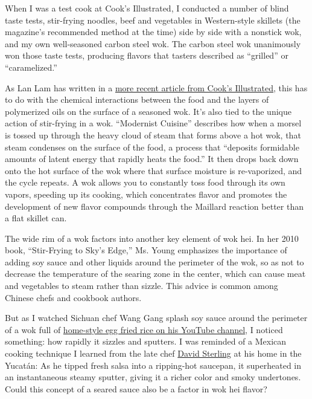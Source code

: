 When I was a test cook at Cook's Illustrated, I conducted a number of
blind taste tests, stir-frying noodles, beef and vegetables in
Western-style skillets (the magazine's recommended method at the time)
side by side with a nonstick wok, and my own well-seasoned carbon steel
wok. The carbon steel wok unanimously won those taste tests, producing
flavors that tasters described as ``grilled'' or ``caramelized.''

As Lan Lam has written in a
\href{https://www.cooksillustrated.com/articles/2189-the-science-of-stir-frying-in-a-wok}{more
recent article from Cook's Illustrated}, this has to do with the
chemical interactions between the food and the layers of polymerized
oils on the surface of a seasoned wok. It's also tied to the unique
action of stir-frying in a wok. ``Modernist Cuisine'' describes how when
a morsel is tossed up through the heavy cloud of steam that forms above
a hot wok, that steam condenses on the surface of the food, a process
that ``deposits formidable amounts of latent energy that rapidly heats
the food.'' It then drops back down onto the hot surface of the wok
where that surface moisture is re-vaporized, and the cycle repeats. A
wok allows you to constantly toss food through its own vapors, speeding
up its cooking, which concentrates flavor and promotes the development
of new flavor compounds through the Maillard reaction better than a flat
skillet can.

The wide rim of a wok factors into another key element of wok hei. In
her 2010 book, ``Stir-Frying to Sky's Edge,'' Ms. Young emphasizes the
importance of adding soy sauce and other liquids around the perimeter of
the wok, so as not to decrease the temperature of the searing zone in
the center, which can cause meat and vegetables to steam rather than
sizzle. This advice is common among Chinese chefs and cookbook authors.

But as I watched Sichuan chef Wang Gang splash soy sauce around the
perimeter of a wok full of
\href{https://www.youtube.com/watch?v=EvE5cYNXufY}{home-style egg fried
rice on his YouTube channel}, I noticed something: how rapidly it
sizzles and sputters. I was reminded of a Mexican cooking technique I
learned from the late chef
\href{https://www.nytimes3xbfgragh.onion/2008/04/23/dining/23mini.html}{David
Sterling} at his home in the Yucatán: As he tipped fresh salsa into a
ripping-hot saucepan, it superheated in an instantaneous steamy sputter,
giving it a richer color and smoky undertones. Could this concept of a
seared sauce also be a factor in wok hei flavor?

